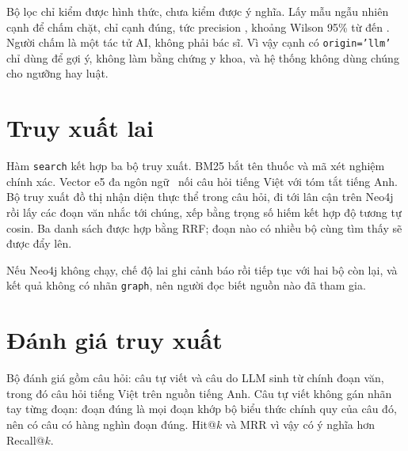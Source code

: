 Bộ lọc chỉ kiểm được hình thức, chưa kiểm được ý nghĩa. Lấy mẫu ngẫu nhiên  cạnh để chấm chặt, chỉ  cạnh đúng, tức precision , khoảng Wilson 95\% từ  đến . Người chấm là một tác tử AI, không phải bác sĩ. Vì vậy cạnh có \texttt{origin='llm'} chỉ dùng để gợi ý, không làm bằng chứng y khoa, và hệ thống không dùng chúng cho ngưỡng hay luật.



\section{Truy xuất lai}

Hàm \texttt{search} kết hợp ba bộ truy xuất. BM25 bắt tên thuốc và mã xét nghiệm chính xác. Vector e5 đa ngôn ngữ~\cite{e5} nối câu hỏi tiếng Việt với tóm tắt tiếng Anh. Bộ truy xuất đồ thị nhận diện thực thể trong câu hỏi, đi tới lân cận trên Neo4j rồi lấy các đoạn văn nhắc tới chúng, xếp bằng trọng số hiếm kết hợp độ tương tự cosin. Ba danh sách được hợp bằng RRF; đoạn nào có nhiều bộ cùng tìm thấy sẽ được đẩy lên.



Nếu Neo4j không chạy, chế độ lai ghi cảnh báo rồi tiếp tục với hai bộ còn lại, và kết quả không có nhãn \texttt{graph}, nên người đọc biết nguồn nào đã tham gia.

\section{Đánh giá truy xuất}

Bộ đánh giá gồm  câu hỏi:  câu tự viết và  câu do LLM sinh từ chính đoạn văn, trong đó  câu hỏi tiếng Việt trên nguồn tiếng Anh. Câu tự viết không gán nhãn tay từng đoạn: đoạn đúng là mọi đoạn khớp bộ biểu thức chính quy của câu đó, nên có câu có hàng nghìn đoạn đúng. Hit@$k$ và MRR vì vậy có ý nghĩa hơn Recall@$k$.

\begin{table}[!htbp]\centering\caption{Năm chế độ truy xuất và thí nghiệm cắt bỏ từng bộ khỏi RRF}\label{tab:rag}
\small\setlength{\tabcolsep}{4pt}\end{table}

